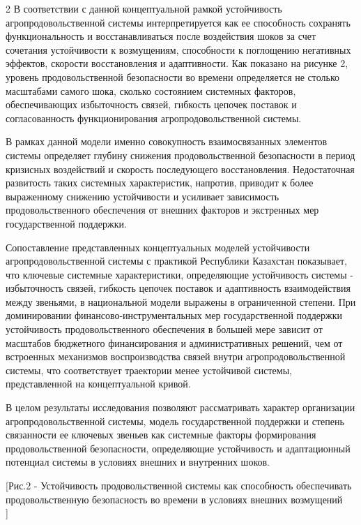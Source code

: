 \begin{multicols}{2}
В соответствии с данной концептуальной рамкой устойчивость
агропродовольственной системы интерпретируется как ее способность
сохранять функциональность и восстанавливаться после воздействия шоков
за счет сочетания устойчивости к возмущениям, способности к поглощению
негативных эффектов, скорости восстановления и адаптивности. Как
показано на рисунке 2, уровень продовольственной безопасности во времени
определяется не столько масштабами самого шока, сколько состоянием
системных факторов, обеспечивающих избыточность связей, гибкость цепочек
поставок и согласованность функционирования агропродовольственной
системы.

В рамках данной модели именно совокупность взаимосвязанных элементов
системы определяет глубину снижения продовольственной безопасности в
период кризисных воздействий и скорость последующего восстановления.
Недостаточная развитость таких системных характеристик, напротив,
приводит к более выраженному снижению устойчивости и усиливает
зависимость продовольственного обеспечения от внешних факторов и
экстренных мер государственной поддержки.

Сопоставление представленных концептуальных моделей устойчивости
агропродовольственной системы с практикой Республики Казахстан
показывает, что ключевые системные характеристики, определяющие
устойчивость системы - избыточность связей, гибкость цепочек поставок и
адаптивность взаимодействия между звеньями, в национальной модели
выражены в ограниченной степени. При доминировании
финансово-инструментальных мер государственной поддержки устойчивость
продовольственного обеспечения в большей мере зависит от масштабов
бюджетного финансирования и административных решений, чем от встроенных
механизмов воспроизводства связей внутри агропродовольственной системы,
что соответствует траектории менее устойчивой системы, представленной на
концептуальной кривой.

В целом результаты исследования позволяют рассматривать характер
организации агропродовольственной системы, модель государственной
поддержки и степень связанности ее ключевых звеньев как системные
факторы формирования продовольственной безопасности, определяющие
устойчивость и адаптационный потенциал системы в условиях внешних и
внутренних шоков.
\end{multicols}

[Рис.2 - Устойчивость продовольственной системы как способность
обеспечивать продовольственную безопасность во времени в условиях
внешних возмущений\\]

